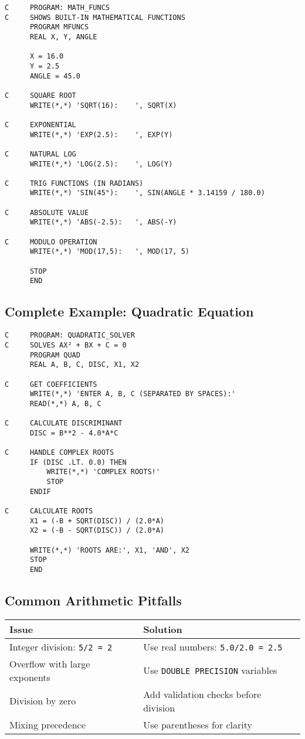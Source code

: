 \documentclass{book}
\begin{document}
\begin{verbatim}
C     PROGRAM: MATH_FUNCS
C     SHOWS BUILT-IN MATHEMATICAL FUNCTIONS
      PROGRAM MFUNCS
      REAL X, Y, ANGLE
      
      X = 16.0
      Y = 2.5
      ANGLE = 45.0
      
C     SQUARE ROOT
      WRITE(*,*) 'SQRT(16):    ', SQRT(X)
      
C     EXPONENTIAL
      WRITE(*,*) 'EXP(2.5):    ', EXP(Y)
      
C     NATURAL LOG
      WRITE(*,*) 'LOG(2.5):    ', LOG(Y)
      
C     TRIG FUNCTIONS (IN RADIANS)
      WRITE(*,*) 'SIN(45°):    ', SIN(ANGLE * 3.14159 / 180.0)
      
C     ABSOLUTE VALUE
      WRITE(*,*) 'ABS(-2.5):   ', ABS(-Y)
      
C     MODULO OPERATION
      WRITE(*,*) 'MOD(17,5):   ', MOD(17, 5)
      
      STOP
      END
\end{verbatim}

\subsection*{Complete Example: Quadratic Equation}
\begin{verbatim}
C     PROGRAM: QUADRATIC_SOLVER
C     SOLVES AX² + BX + C = 0
      PROGRAM QUAD
      REAL A, B, C, DISC, X1, X2
      
C     GET COEFFICIENTS
      WRITE(*,*) 'ENTER A, B, C (SEPARATED BY SPACES):'
      READ(*,*) A, B, C
      
C     CALCULATE DISCRIMINANT
      DISC = B**2 - 4.0*A*C
      
C     HANDLE COMPLEX ROOTS
      IF (DISC .LT. 0.0) THEN
          WRITE(*,*) 'COMPLEX ROOTS!'
          STOP
      ENDIF
      
C     CALCULATE ROOTS
      X1 = (-B + SQRT(DISC)) / (2.0*A)
      X2 = (-B - SQRT(DISC)) / (2.0*A)
      
      WRITE(*,*) 'ROOTS ARE:', X1, 'AND', X2
      STOP
      END
\end{verbatim}

\subsection*{Common Arithmetic Pitfalls}
\begin{center}
\begin{tabular}{|p{4cm}|p{8cm}|}
\hline
\textbf{Issue} & \textbf{Solution} \\ 
\hline
Integer division: \texttt{5/2 = 2} & Use real numbers: \texttt{5.0/2.0 = 2.5} \\
\hline
Overflow with large exponents & Use \texttt{DOUBLE PRECISION} variables \\
\hline
Division by zero & Add validation checks before division \\
\hline
Mixing precedence & Use parentheses for clarity \\
\hline
\end{tabular}
\end{center}
\end{document}
